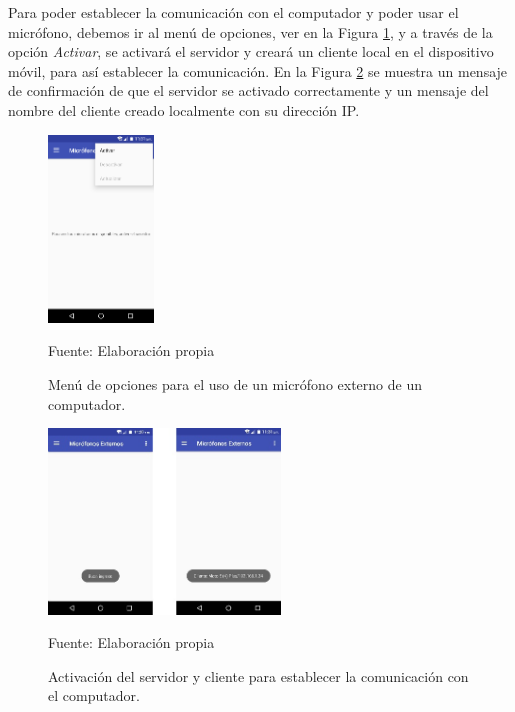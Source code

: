Para poder establecer la comunicación con el computador y poder usar el micrófono, debemos ir al menú de opciones, ver en la Figura \ref{fig:figura3.56}, y a través de la opción \textit{Activar}, se activará el servidor y creará un cliente local en el dispositivo móvil, para así establecer la comunicación. En la Figura \ref{fig:figura3.57} se muestra un mensaje de confirmación de que el servidor se activado correctamente y un mensaje del nombre del cliente creado localmente con su dirección IP.
\begin{figure}[H]
\captionsetup{justification=centering}
\begin{center}
\includegraphics[width=0.25\textwidth]{Imagenes/Cap3/image056}
\end{center}
\begin{center}
\vskip -0.5cm
\caption{\small{Menú de opciones para el uso de un micrófono externo de un computador.}}
\label{fig:figura3.56}
{\small{Fuente: Elaboración propia}}
\end{center}
\end{figure}

\begin{figure}[H]
\captionsetup{justification=centering}
\begin{center}
\includegraphics[width=0.55\textwidth]{Imagenes/Cap3/image057}
\end{center}
\begin{center}
\vskip -0.5cm
\caption{\small{Activación del servidor y cliente para establecer la comunicación con el computador.}}
\label{fig:figura3.57}
{\small{Fuente: Elaboración propia}}
\end{center}
\end{figure}

